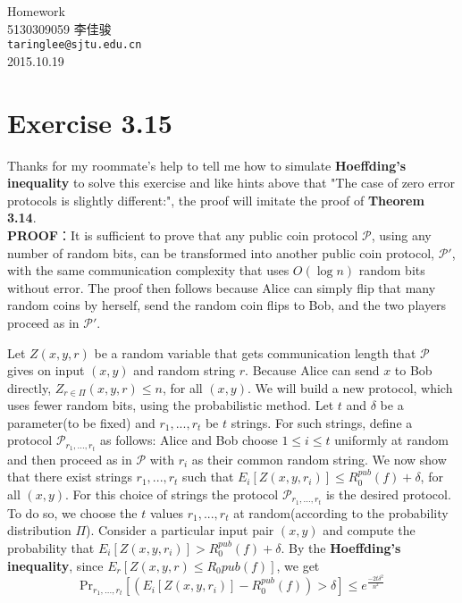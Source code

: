 \documentclass[11pt, fleqn, a4paper]{report}
\begin{document}
\begin{titlepage}
\vspace*{40mm}
\begin{center}
{\Huge Homework }\\[30mm]

{\Large 5130309059 \quad \quad 李佳骏}\\[3mm]
\texttt{taringlee@sjtu.edu.cn}\\[10mm]

2015.10.19

\end{center}
\end{titlepage}

\section*{Exercise 3.15}

Thanks for my roommate’s help to tell me how to simulate \textbf{Hoeffding's inequality} to solve this exercise and like hints above that "The case of zero error protocols is slightly different:", the proof will imitate the proof of \textbf{Theorem 3.14}.\\

\textbf{PROOF}：It is sufficient to prove that any public coin protocol $\mathcal{P}$, using any number of random bits, can be transformed into another public coin protocol, $\mathcal{P}'$, with the same communication complexity that uses $O(\log{n})$ random bits without error. The proof then follows because Alice can simply flip that many random coins by herself, send the random coin flips to Bob, and the two players proceed as in $\mathcal{P}'$.

Let $Z(x, y, r)$ be a random variable that gets communication length that $\mathcal{P}$ gives on input $(x,y)$ and random string $r$. Because Alice can send $x$ to Bob directly, $Z_{r \in \Pi}(x,y,r) \leq n$, for all $(x,y)$. We will build a new protocol, which uses fewer random bits, using the probabilistic method. Let $t$ and $\delta$ be a parameter(to be fixed) and $r_1,...,r_t$ be $t$ strings. For such strings, define a protocol $\mathcal{P}_{r_1,...,r_t}$ as follows: Alice and Bob choose $1 \leq i \leq t$ uniformly at random and then proceed as in $\mathcal{P}$ with $r_i$ as their common random string. We now show that there exist strings $r_1,...,r_t$ such that $E_i[Z(x,y,r_i)] \leq R_0^{pub}(f)+\delta$, for all $(x,y)$. For this choice of strings the protocol $\mathcal{P}_{r_1,...,r_t}$ is the desired protocol. To do so, we choose the $t$ values $r_1,...,r_t$ at random(according to the probability distribution $\Pi$). Consider a particular input pair $(x,y)$ and compute the probability that $E_i[Z(x,y,r_i)] > R_0^{pub}(f) + \delta$. By the \textbf{Hoeffding's inequality}, since $E_r[Z(x,y,r) \leq R_0{pub}(f)]$, we get
$$\mathrm{Pr}_{r_1,...,r_t}[(E_i[Z(x,y,r_i)] - R_0^{pub}(f)) > \delta] \leq e^{\frac{-2t\delta^2}{n^2}}$$
\end{document}
